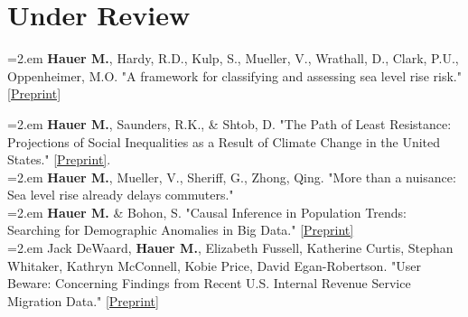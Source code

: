 \section{Under Review}

\hangindent=2.em \textbf{Hauer M.}, Hardy, R.D., Kulp, S., Mueller, V., Wrathall, D., Clark, P.U., Oppenheimer, M.O. "A framework for classifying and assessing sea level rise risk." \href{https://osf.io/preprints/socarxiv/tf6rj/}{[Preprint]}

 \hangindent=2.em \textbf{Hauer M.}, Saunders, R.K., \& Shtob, D. "The Path of Least Resistance: Projections of Social Inequalities as a Result of Climate Change in the United States." \href{https://osf.io/preprints/socarxiv/7jtrn/}{[Preprint]}. \\

 \hangindent=2.em \textbf{Hauer M.}, Mueller, V., Sheriff, G., Zhong, Qing. "More than a nuisance: Sea level rise already delays commuters."\\

       \hangindent=2.em \textbf{Hauer M.} \& Bohon, S. "Causal Inference in Population Trends: Searching for Demographic Anomalies in Big Data." \href{https://osf.io/preprints/socarxiv/xn2v9/}{[Preprint]}  \\

       \hangindent=2.em Jack DeWaard, \textbf{Hauer M.}, Elizabeth Fussell, Katherine Curtis, Stephan Whitaker, Kathryn McConnell, Kobie Price, David Egan-Robertson. "User Beware: Concerning Findings from Recent U.S. Internal Revenue Service Migration Data." \href{https://assets.ipums.org/_files/mpc/wp2020-02.pdf}{[Preprint]}\\

%



%
%




